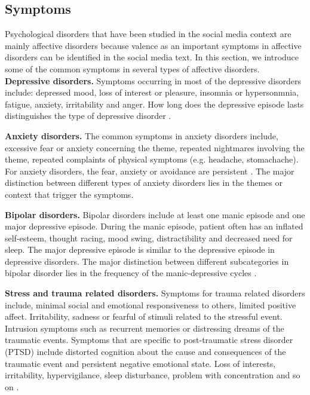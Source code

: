 \subsection{Symptoms}
Psychological disorders that have been studied in the social media context are mainly affective disorders because valence as an important symptoms in affective disorders can be identified in the social media text. In this section, we introduce some of the common symptoms in several types of affective disorders.
\textbf{Depressive disorders.} Symptoms occurring in most of the depressive disorders include: depressed mood, loss of interest or pleasure, insomnia or hypersonmnia, fatigue, anxiety, irritability and anger. How long does the depressive episode lasts distinguishes the type of depressive disorder \cite{american2013diagnostic}.

\textbf{Anxiety disorders.} The common symptoms in anxiety disorders include, excessive fear or anxiety concerning the theme, repeated nightmares involving the theme, repeated complaints of physical symptoms (e.g. headache, stomachache). For anxiety disorders, the fear, anxiety or avoidance are persistent \cite{american2013diagnostic}. The major distinction between different types of anxiety disorders lies in the themes or context that trigger the symptoms.

\textbf{Bipolar disorders.} Bipolar disorders include at least one manic episode and one major depressive episode.  During the manic episode, patient often has an inflated self-esteem, thought racing, mood swing, distractibility and decreased need for sleep. The major depressive episode is similar to the depressive episode in depressive disorders. The major distinction between different subcategories in bipolar disorder lies in the frequency of the manic-depressive cycles \cite{american2013diagnostic}.

\textbf{Stress and trauma related disorders.} Symptoms for trauma related disorders include, minimal social and emotional responsiveness to others, limited positive affect. Irritability, sadness or fearful of stimuli related to the stressful event. Intrusion symptoms such as recurrent memories or distressing dreams of the traumatic events. Symptoms that are specific to post-traumatic stress disorder (PTSD) include distorted cognition about the cause and consequences of the traumatic event and persistent negative emotional state. Loss of interests, irritability, hypervigilance, sleep disturbance, problem with concentration and so on \cite{american2013diagnostic}.

